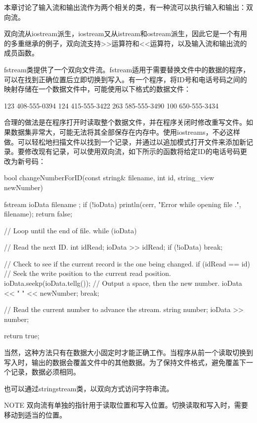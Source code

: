 本章讨论了输入流和输出流作为两个相关的类，有一种流可以执行输入和输出：双向流。

双向流从iostream派生，iostream又从istream和ostream派生，因此它是一个有用的多重继承的例子，双向流支持>{}>运算符和<{}<运算符，以及输入流和输出流的成员函数。

fstream类提供了一个双向文件流。fstream适用于需要替换文件中的数据的程序，可以在找到正确位置后立即切换到写入。有一个程序，将ID号和电话号码之间的映射存储在一个数据文件中，可能使用以下格式的数据文件：

\begin{shell}
123 408-555-0394
124 415-555-3422
263 585-555-3490
100 650-555-3434
\end{shell}

合理的做法是在程序打开时读取整个数据文件，并在程序关闭时修改重写文件。如果数据集非常大，可能无法将其全部保存在内存中。使用iostreams，不必这样做。可以轻松地扫描文件以找到一个记录，并通过以追加模式打开文件来添加新记录。要修改现有记录，可以使用双向流，如下所示的函数将给定ID的电话号码更改为新号码：

\begin{cpp}
bool changeNumberForID(const string& filename, int id, string_view newNumber)
{
    fstream ioData { filename };
    if (!ioData) {
        println(cerr, "Error while opening file {}.", filename);
        return false;
    }

    // Loop until the end of file.
    while (ioData) {
        // Read the next ID.
        int idRead;
        ioData >> idRead;
        if (!ioData) { break; }

        // Check to see if the current record is the one being changed.
        if (idRead == id) {
            // Seek the write position to the current read position.
            ioData.seekp(ioData.tellg());
            // Output a space, then the new number.
            ioData << " " << newNumber;
            break;
        }

        // Read the current number to advance the stream.
        string number;
        ioData >> number;
    }
    return true;
}
\end{cpp}

当然，这种方法只有在数据大小固定时才能正确工作。当程序从前一个读取切换到写入时，输出的数据会覆盖文件中的其他数据。为了保持文件格式，避免覆盖下一个记录，数据必须相同。

也可以通过stringstream类，以双向方式访问字符串流。

\begin{myNotic}{NOTE}
双向流有单独的指针用于读取位置和写入位置。切换读取和写入时，需要移动到适当的位置。
\end{myNotic}















